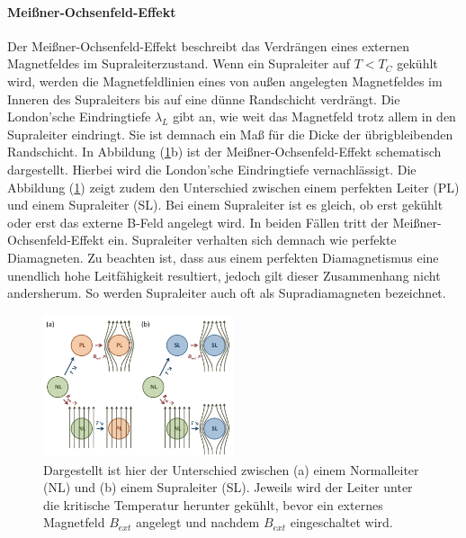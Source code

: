 \paragraph{Mei{\ss}ner-Ochsenfeld-Effekt}
Der Mei{\ss}ner-Ochsenfeld-Effekt beschreibt das Verdr\"{a}ngen eines externen Magnetfeldes im Supraleiterzustand.
Wenn ein Supraleiter auf $T < T_C$ gek\"{u}hlt wird, werden die Magnetfeldlinien eines von au{\ss}en angelegten Magnetfeldes im Inneren des Supraleiters bis auf eine d\"{u}nne Randschicht verdr\"{a}ngt.
Die London'sche Eindringtiefe $\lambda_L$ gibt an, wie weit das Magnetfeld trotz allem in den Supraleiter eindringt.
Sie ist demnach ein Ma{\ss} f\"{u}r die Dicke der \"{u}brigbleibenden Randschicht.
In Abbildung (\ref{abb:MOEffekt}b) ist der Mei{\ss}ner-Ochsenfeld-Effekt schematisch dargestellt.
Hierbei wird die London'sche Eindringtiefe vernachl\"{a}ssigt.
Die Abbildung (\ref{abb:MOEffekt}) zeigt zudem den Unterschied zwischen einem perfekten Leiter (PL) und einem Supraleiter (SL).
Bei einem Supraleiter ist es gleich, ob erst gek\"{u}hlt oder erst das externe B-Feld angelegt wird.
In beiden F\"{a}llen tritt der Mei{\ss}ner-Ochsenfeld-Effekt ein.
Supraleiter verhalten sich demnach wie perfekte Diamagneten.
Zu beachten ist, dass aus einem perfekten Diamagnetismus eine unendlich hohe Leitf\"{a}higkeit resultiert, jedoch gilt dieser Zusammenhang nicht andersherum.
So werden Supraleiter auch oft als Supradiamagneten bezeichnet.
\begin{figure}
	\centering
	\includegraphics[width=0.5\textwidth]{Plots/MO_Effekt.png}
	\caption{Dargestellt ist hier der Unterschied zwischen (a) einem Normalleiter (NL) und (b) einem Supraleiter (SL). Jeweils wird der Leiter unter die kritische Temperatur herunter gek\"{u}hlt, bevor ein externes Magnetfeld $B_{ext}$ angelegt und nachdem $B_{ext}$ eingeschaltet wird. \cite{einleitung}}
	\label{abb:MOEffekt}
\end{figure}


